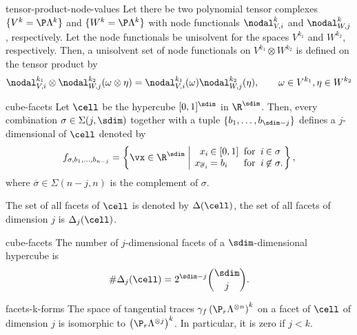 \begin{Theorem}{tensor-product-node-values}
  Let there be two polynomial tensor complexes $\{V^k=\P\Lambda^k\}$
  and $\{W^k=\P\Lambda^k\}$ with node functionals $\nodal_{V,i}^k$ and
  $\nodal_{W,j}^k$, respectively. Let the node functionals be
  unisolvent for the spaces $V^{k_1}$ and $W^{k_2}$,
  respectively. Then, a unisolvent set of node functionals on
  $V^{k_1}\otimes W^{k_2}$ is defined on the tensor product by
  \begin{gather}
    \nodal_{V,i}^{k_1}\otimes\nodal_{W,j}^{k_2}(\omega\otimes\eta)
    = \nodal_{V,i}^{k_1}(\omega)\nodal_{W,j}^{k_2}(\eta),
    \qquad \omega\in V^{k_1}, \eta\in W^{k_2}
  \end{gather}
\end{Theorem}

\begin{Definition}{cube-facets}
  Let $\cell$ be the hypercube $[0,1]^\sdim$ in $\R^\sdim$. Then,
  every combination $\sigma\in\Sigma(j,\sdim)$ together with a tuple
  $\{b_1,\dots,b_{\sdim-j}\}$ defines a $j$-dimensional  of $\cell$ denoted by
  \begin{gather}
    f_{\sigma,b_1,\dots,b_{n-j}} =
    \left\{
      \vx\in\R^\sdim \;\middle\vert\;
      \arraycolsep1pt
      \begin{array}{rlcrl}
        x_i &\in [0,1] &\text{ for }& i&\in\sigma\\
        x_{\overline\sigma_i} &= b_i&\text{ for }& i&\not\in\sigma.
      \end{array}
    \right\},
  \end{gather}
  where $\overline\sigma\in\Sigma(n-j,n)$ is the complement of $\sigma$.

  The set of all facets of $\cell$ is denoted by $\Delta(\cell)$, the
  set of all facets of dimension $j$ is $\Delta_j(\cell)$.
\end{Definition}

\begin{Lemma}{cube-facets}
  The number of $j$-dimensional facets of a $\sdim$-dimensional hypercube is
  \begin{gather}
    \#\Delta_j(\cell) = 2^{\sdim-j}\binom{\sdim}{j}.
  \end{gather}
\end{Lemma}

\begin{Lemma}{facets-k-forms}
  The space of tangential traces
  $\gamma_f \left(\P_r\Lambda^{\otimes n}\right)^k$ on a facet of $\cell$ of
  dimension $j$ is isomorphic to
  $\left(\P_r\Lambda^{\otimes {j}}\right)^k$. In particular, it is zero if $j<k$.
\end{Lemma}

